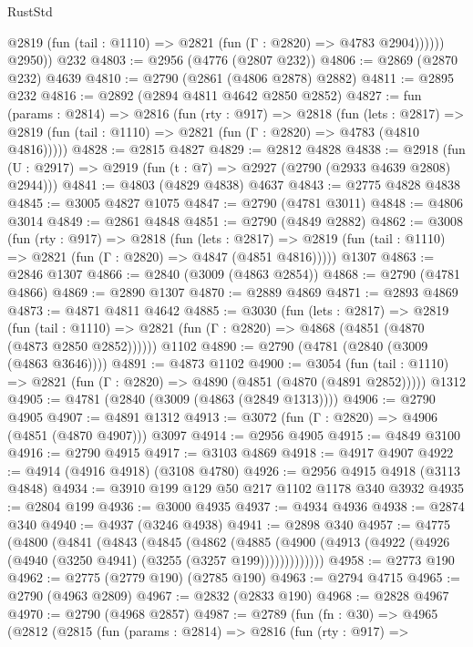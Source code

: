 \begin{lexlean}{RustStd}
\begin{coremodule}
              @2819 (fun (tail : @1110) => @2821 (fun (Γ : @2820) => @4783 @2904))))))
        @2950))
    @232
@4803 := @2956 (@4776 (@2807 @232))
@4806 := @2869 (@2870 @232) @4639
@4810 := @2790 (@2861 (@4806 @2878) @2882)
@4811 := @2895 @232
@4816 := @2892 (@2894 @4811 @4642 @2850 @2852)
@4827 := fun (params : @2814) =>
  @2816
    (fun (rty : @917) =>
    @2818
      (fun (lets : @2817) =>
      @2819 (fun (tail : @1110) => @2821 (fun (Γ : @2820) => @4783 (@4810 @4816)))))
@4828 := @2815 @4827
@4829 := @2812 @4828
@4838 := @2918 (fun (U : @2917) => @2919 (fun (t : @7) => @2927 (@2790 (@2933 @4639 @2808) @2944)))
@4841 := @4803 (@4829 @4838) @4637
@4843 := @2775 @4828 @4838
@4845 := @3005 @4827 @1075
@4847 := @2790 (@4781 @3011)
@4848 := @4806 @3014
@4849 := @2861 @4848
@4851 := @2790 (@4849 @2882)
@4862 := @3008
    (fun (rty : @917) =>
    @2818
      (fun (lets : @2817) =>
      @2819 (fun (tail : @1110) => @2821 (fun (Γ : @2820) => @4847 (@4851 @4816)))))
    @1307
@4863 := @2846 @1307
@4866 := @2840 (@3009 (@4863 @2854))
@4868 := @2790 (@4781 @4866)
@4869 := @2890 @1307
@4870 := @2889 @4869
@4871 := @2893 @4869
@4873 := @4871 @4811 @4642
@4885 := @3030
    (fun (lets : @2817) =>
    @2819
      (fun (tail : @1110) => @2821 (fun (Γ : @2820) => @4868 (@4851 (@4870 (@4873 @2850 @2852))))))
    @1102
@4890 := @2790 (@4781 (@2840 (@3009 (@4863 @3646))))
@4891 := @4873 @1102
@4900 := @3054
    (fun (tail : @1110) => @2821 (fun (Γ : @2820) => @4890 (@4851 (@4870 (@4891 @2852)))))
    @1312
@4905 := @4781 (@2840 (@3009 (@4863 (@2849 @1313))))
@4906 := @2790 @4905
@4907 := @4891 @1312
@4913 := @3072 (fun (Γ : @2820) => @4906 (@4851 (@4870 @4907))) @3097
@4914 := @2956 @4905
@4915 := @4849 @3100
@4916 := @2790 @4915
@4917 := @3103 @4869
@4918 := @4917 @4907
@4922 := @4914 (@4916 @4918) (@3108 @4780)
@4926 := @2956 @4915 @4918 (@3113 @4848)
@4934 := @3910 @199 @129 @50 @217 @1102 @1178 @340 @3932
@4935 := @2804 @199
@4936 := @3000 @4935
@4937 := @4934 @4936
@4938 := @2874 @340
@4940 := @4937 (@3246 @4938)
@4941 := @2898 @340
@4957 := @4775
    (@4800
      (@4841
        (@4843
          (@4845
            (@4862
              (@4885
                (@4900 (@4913 (@4922 (@4926 (@4940 (@3250 @4941) (@3255 (@3257 @199)))))))))))))
@4958 := @2773 @190
@4962 := @2775 (@2779 @190) (@2785 @190)
@4963 := @2794 @4715
@4965 := @2790 (@4963 @2809)
@4967 := @2832 (@2833 @190)
@4968 := @2828 @4967
@4970 := @2790 (@4968 @2857)
@4987 := @2789
    (fun (fn : @30) =>
    @4965
      (@2812
        (@2815
          (fun (params : @2814) =>
          @2816
            (fun (rty : @917) =>

\end{coremodule}
\end{lexlean}
